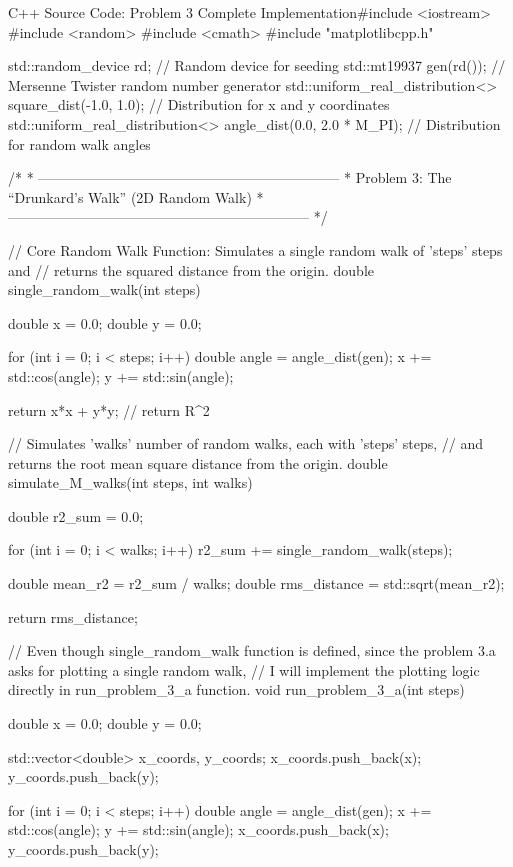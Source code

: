 \documentclass{article}
\begin{document}
\begin{codebox}{C++ Source Code: Problem 3 Complete Implementation}#include <iostream>
#include <random>
#include <cmath> 
#include "matplotlibcpp.h"

std::random_device rd; // Random device for seeding
std::mt19937 gen(rd()); // Mersenne Twister random number generator
std::uniform_real_distribution<> square_dist(-1.0, 1.0); // Distribution for x and y coordinates
std::uniform_real_distribution<> angle_dist(0.0, 2.0 * M_PI); // Distribution for random walk angles

/* 
 * -----------------------------------------------------------------
 * Problem 3: The “Drunkard’s Walk” (2D Random Walk)
 * -----------------------------------------------------------------
 */


// Core Random Walk Function: Simulates a single random walk of 'steps' steps and 
// returns the squared distance from the origin.
double single_random_walk(int steps) {

    double x = 0.0;
    double y = 0.0;

    for (int i = 0; i < steps; i++) {
        double angle = angle_dist(gen);
        x += std::cos(angle);
        y += std::sin(angle);
    }

    return x*x + y*y;  // return R^2
}

// Simulates 'walks' number of random walks, each with 'steps' steps,
// and returns the root mean square distance from the origin.
double simulate_M_walks(int steps, int walks) {

    double r2_sum = 0.0; 

    for (int i = 0; i < walks; i++) {
        r2_sum += single_random_walk(steps);
    }

    double mean_r2 = r2_sum / walks;
    double rms_distance = std::sqrt(mean_r2);

    return rms_distance;
}


// Even though single_random_walk function is defined, since the problem 3.a asks for plotting a single random walk,
// I will implement the plotting logic directly in run_problem_3_a function.
void run_problem_3_a(int steps) {
    double x = 0.0;
    double y = 0.0;
    
    std::vector<double> x_coords, y_coords;
    x_coords.push_back(x);
    y_coords.push_back(y);

    for (int i = 0; i < steps; i++) {
        double angle = angle_dist(gen);
        x += std::cos(angle);
        y += std::sin(angle);
        x_coords.push_back(x);
        y_coords.push_back(y);
    }

}
\end{codebox}
\end{document}
